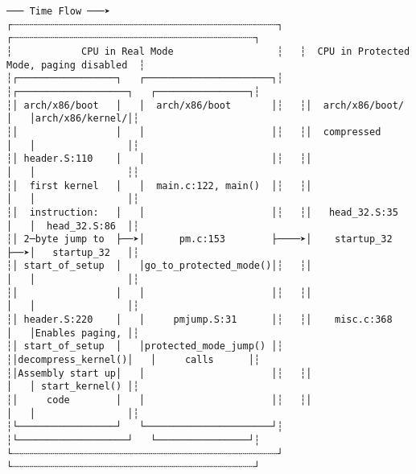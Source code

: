 \documentclass[varwidth=100em]{standalone}
\begin{document}
\begin{verbatim}
─── Time Flow ───➤
┌┄┄┄┄┄┄┄┄┄┄┄┄┄┄┄┄┄┄┄┄┄┄┄┄┄┄┄┄┄┄┄┄┄┄┄┄┄┄┄┄┄┄┄┄┄┄┐   ┌┄┄┄┄┄┄┄┄┄┄┄┄┄┄┄┄┄┄┄┄┄┄┄┄┄┄┄┄┄┄┄┄┄┄┄┄┄┄┄┄┄┄┐
┆            CPU in Real Mode                  ┆   ┆  CPU in Protected Mode, paging disabled  ┆
┆┌─────────────────┐   ┌──────────────────────┐┆   ┆┌───────────────────┐   ┌────────────────┐┆
┆│ arch/x86/boot   │   │  arch/x86/boot       │┆   ┆│  arch/x86/boot/   │   │arch/x86/kernel/│┆
┆│                 │   │                      │┆   ┆│  compressed       │   │                │┆
┆│ header.S:110    │   │                      │┆   ┆│                   │   │                ┆┆
┆│  first kernel   │   │  main.c:122, main()  │┆   ┆│                   │   │                │┆
┆│  instruction:   │   │                      │┆   ┆│   head_32.S:35    │   │  head_32.S:86  │┆
┆│ 2─byte jump to  ├──➤│      pm.c:153        ├────➤│    startup_32     ├──➤│   startup_32   │┆
┆│ start_of_setup  │   │go_to_protected_mode()│┆   ┆│                   │   │                │┆
┆│                 │   │                      │┆   ┆│                   │   │                │┆
┆│ header.S:220    │   │     pmjump.S:31      │┆   ┆│    misc.c:368     │   │Enables paging, │┆
┆│ start_of_setup  │   │protected_mode_jump() │┆   ┆│decompress_kernel()│   │     calls      │┆
┆│Assembly start up│   │                      │┆   ┆│                   │   │ start_kernel() │┆
┆│     code        │   │                      │┆   ┆│                   │   │                │┆
┆└─────────────────┘   └──────────────────────┘┆   ┆└───────────────────┘   └────────────────┘┆
└┄┄┄┄┄┄┄┄┄┄┄┄┄┄┄┄┄┄┄┄┄┄┄┄┄┄┄┄┄┄┄┄┄┄┄┄┄┄┄┄┄┄┄┄┄┄┘   └┄┄┄┄┄┄┄┄┄┄┄┄┄┄┄┄┄┄┄┄┄┄┄┄┄┄┄┄┄┄┄┄┄┄┄┄┄┄┄┄┄┄┘
\end{verbatim}
\end{document}
